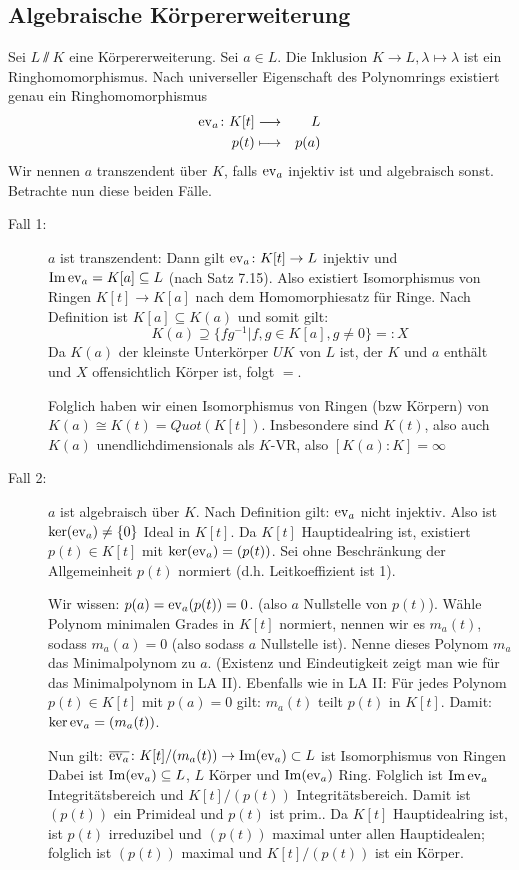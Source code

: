 \documentclass[12pt,a4paper]{scrartcl}
\begin{document}
\subsection{Algebraische Körpererweiterung}
Sei $L\sslash K$ eine Körpererweiterung. Sei $a\in L$. Die Inklusion $K\to L, \lambda\mapsto\lambda$ ist ein Ringhomomorphismus. Nach universeller Eigenschaft des Polynomrings existiert genau ein Ringhomomorphismus
\begin{eqnarray*}
	\operatorname{ev}_a\colon K[t] &\longrightarrow & L\\
	p(t) & \longmapsto & p(a)
\end{eqnarray*}
Wir nennen $a$ transzendent über $K$, falls $\operatorname{ev}_a$ injektiv ist und algebraisch sonst. Betrachte nun diese beiden Fälle.
\begin{description}
	\item[Fall 1:] $a$ ist transzendent: Dann gilt $\operatorname{ev}_a\colon  K[t]\to L$ injektiv und $\operatorname{Im}\operatorname{ev}_a = K[a]\subseteq L$ (nach Satz 7.15). %
	Also existiert Isomorphismus von Ringen $K[t]\to K[a]$ nach dem Homomorphiesatz für Ringe. Nach Definition ist $K[a]\subseteq K(a)$ und somit gilt:
	$$K(a) \supseteq \{fg^{-1}|f,g\in K[a], g\neq 0\} = : X$$
	Da $K(a)$ der kleinste Unterkörper $UK$ von $L$ ist, der $K$ und $a$ enthält und $X$ offensichtlich Körper ist, folgt $=$.
	
	Folglich haben wir einen Isomorphismus von Ringen (bzw Körpern) von $K(a)\cong K(t) = Quot(K[t])$. Insbesondere sind $K(t)$, also auch $K(a)$ unendlichdimensionals als $K$-VR, also $[K(a):K] = \infty$
	
	\item[Fall 2:] $a$ ist algebraisch über $K$. Nach Definition gilt: $\operatorname{ev}_a$ nicht injektiv. Also ist $\operatorname{ker}(\operatorname{ev}_a)\neq \{0\}$ Ideal in $K[t]$. Da $K[t]$ Hauptidealring ist, existiert $p(t)\in K[t]$ mit $\operatorname{ker}(\operatorname{ev}_a) = (p(t))$. Sei ohne Beschränkung der Allgemeinheit $p(t)$ normiert (d.h. Leitkoeffizient ist 1).
	
	Wir wissen: $p(a) = \operatorname{ev}_a(p(t)) = 0$. (also $a$ Nullstelle von $p(t)$). Wähle Polynom minimalen Grades in $K[t]$ normiert, nennen wir es $m_a(t)$, sodass $m_a(a) = 0$ (also sodass $a$ Nullstelle ist). Nenne dieses Polynom $m_a$ das Minimalpolynom zu $a$. (Existenz und Eindeutigkeit zeigt man wie für das Minimalpolynom in LA II). Ebenfalls wie in LA II: Für jedes Polynom $p(t)\in K[t]$ mit $p(a) = 0$ gilt: $m_a(t)$ teilt $p(t)$ in $K[t]$. Damit: $\operatorname{ker}\operatorname{ev}_a = (m_a(t))$.

	Nun gilt: $\overline{\operatorname{ev}_a}\colon K[t]/(m_a(t))\to \operatorname{Im}(\operatorname{ev}_a)\subset L$ ist Isomorphismus von Ringen
	Dabei ist $\operatorname{Im}(\operatorname{ev}_a)\subseteq L$, $L$ Körper und $\operatorname{Im}(\operatorname{ev}_a)$ Ring. Folglich ist $\operatorname{Im}\operatorname{ev}_a$ Integritätsbereich und $K[t]/(p(t))$ Integritätsbereich. Damit ist $(p(t))$ ein Primideal und $p(t)$ ist prim.. Da $K[t]$ Hauptidealring ist, ist $p(t)$ irreduzibel und $(p(t))$ maximal unter allen Hauptidealen; folglich ist $(p(t))$ maximal und $K[t]/(p(t))$ ist ein Körper.
	

\end{description}
\end{document}
